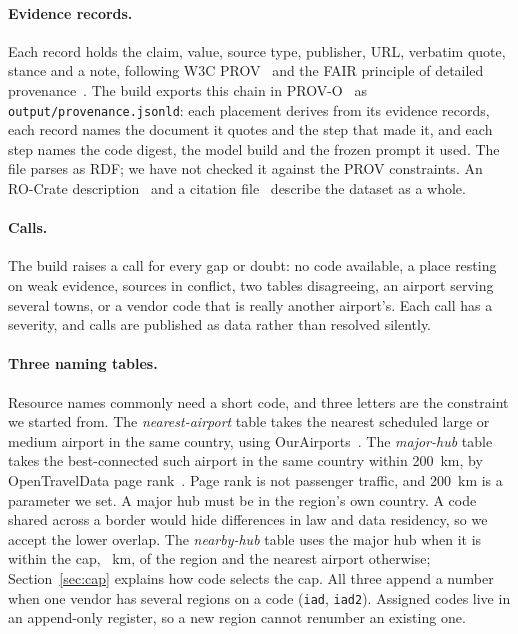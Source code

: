 \documentclass[10pt,twocolumn]{article}
\newcommand{\code}[1]{\texttt{#1}}
\begin{document}
\paragraph{Evidence records.} Each record holds the claim, value, source type, publisher, URL, verbatim quote, stance and a note, following W3C PROV~\citep{w3c2013provdm} and the FAIR principle of detailed provenance~\citep{wilkinson2016fair}. The build exports this chain in PROV-O~\citep{w3c2013provo} as \code{output/provenance.jsonld}: each placement derives from its evidence records, each record names the document it quotes and the step that made it, and each step names the code digest, the model build and the frozen prompt it used. The file parses as RDF; we have not checked it against the PROV constraints. An RO-Crate description~\citep{soilandreyes2022rocrate} and a citation file~\citep{cff_format} describe the dataset as a whole.

\paragraph{Calls.} The build raises a call for every gap or doubt: no code available, a place resting on weak evidence, sources in conflict, two tables disagreeing, an airport serving several towns, or a vendor code that is really another airport's. Each call has a severity, and calls are published as data rather than resolved silently.

\paragraph{Three naming tables.} Resource names commonly need a short code, and three letters are the constraint we started from. The \emph{nearest-airport} table takes the nearest scheduled large or medium airport in the same country, using OurAirports~\citep{ourairports_data}. The \emph{major-hub} table takes the best-connected such airport in the same country within 200~km, by OpenTravelData page rank~\citep{opentraveldata}. Page rank is not passenger traffic, and 200~km is a parameter we set. A major hub must be in the region's own country. A code shared across a border would hide differences in law and data residency, so we accept the lower overlap. The \emph{nearby-hub} table uses the major hub when it is within the cap, \capUsed{}~km, of the region and the nearest airport otherwise; Section~\ref{sec:cap} explains how code selects the cap. All three append a number when one vendor has several regions on a code (\code{iad}, \code{iad2}). Assigned codes live in an append-only register, so a new region cannot renumber an existing one.
\end{document}
